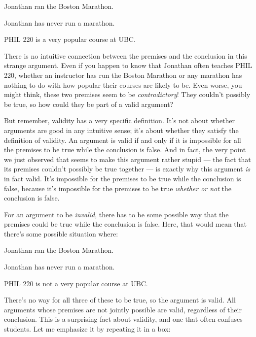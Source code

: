\begin{earg}
\item Jonathan ran the Boston Marathon.
\item Jonathan has never run a marathon.
\item[\therefore] PHIL 220 is a very popular course at UBC.
\end{earg}

There is no intuitive connection between the premises and the conclusion in this strange argument. Even if you happen to know that Jonathan often teaches PHIL 220, whether an instructor has run the Boston Marathon or any marathon has nothing to do with how popular their courses are likely to be. Even worse, you might think, these two premises seem to be \emph{contradictory}! They couldn't possibly be true, so how could they be part of a valid argument?

But remember, validity has a very specific definition. It's not about whether arguments are good in any intuitive sense; it's about whether they satisfy the definition of validity. An argument is valid if and only if it is impossible for all the premises to be true while the conclusion is false. And in fact, the very point we just observed that seems to make this argument rather stupid --- the fact that its premises couldn't possibly be true together --- is exactly why this argument \emph{is} in fact valid. It's impossible for the premises to be true while the conclusion is false, because it's impossible for the premises to be true \emph{whether or not} the conclusion is false.

For an argument to be \emph{invalid}, there has to be some possible way that the premises could be true while the conclusion is false. Here, that would mean that there's some possible situation where:

\begin{earg}
\item[(1)] Jonathan ran the Boston Marathon.
\item[(2)] Jonathan has never run a marathon.
\item[(3)] PHIL 220 is not a very popular course at UBC.
\end{earg}

There's no way for all three of these to be true, so the argument is valid. All arguments whose premises are not jointly possible are valid, regardless of their conclusion. This is a surprising fact about validity, and one that often confuses students. Let me emphasize it by repeating it in a box:

